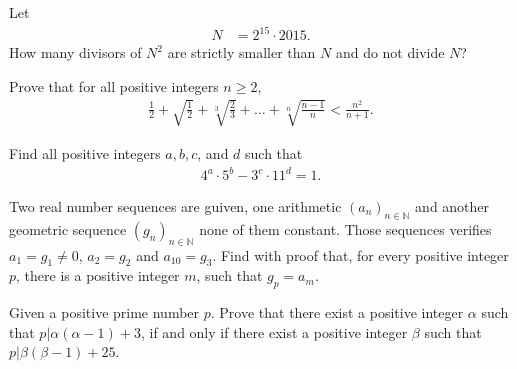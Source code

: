 \documentclass[problems.tex]{subfile}
\begin{document}
	
	
	\begin{problem}
		Let
		\begin{align*}
			N &= 2^{15} \cdot 2015.
		\end{align*}
		How many divisors of $N^2$ are strictly smaller than $N$ and do not divide $N$?
	\end{problem}
	
	
	
	\begin{problem}
		Prove that for all positive integers $n \geq 2$,
		\begin{align*}
			\frac{1}{2} + \sqrt{\frac{1}{2}}+ \sqrt[3]{\frac{2}{3}}+ \dots + \sqrt[n]{\frac{n-1}{n}} < \frac{n^2}{n+1}.
		\end{align*}
	\end{problem}
	
	
	
	\begin{problem}
		Find all positive integers $a, b, c$, and $d$ such that
		\begin{align*}
			4^a \cdot 5^b - 3^c \cdot 11^d = 1.
		\end{align*}
	\end{problem}
	
	
	
	
	
	\begin{problem}
		Two real number sequences are guiven, one arithmetic $\left(a_n\right)_{n\in \mathbb {N}}$ and another geometric sequence $\left(g_n\right)_{n\in \mathbb {N}}$ none of them constant. Those sequences verifies $a_1=g_1\neq 0$, $a_2=g_2$ and $a_{10}=g_3$. Find with proof that, for every positive integer $p$, there is a positive integer $m$, such that $g_p=a_m$. %
	\end{problem}
	
	
	
	\begin{problem}
		Given a positive prime number $p$. Prove that there exist a positive integer $\alpha$ such that $p|\alpha(\alpha-1)+3$, if and only if there exist a positive integer $\beta$ such that $p|\beta(\beta-1)+25$. %
	\end{problem}
	
\end{document}
